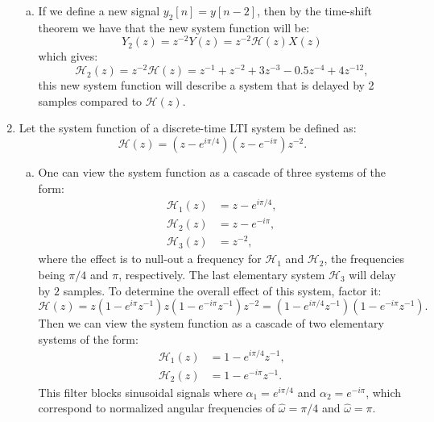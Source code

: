 \begin{enumerate}
\begin{enumerate}[a)]
              \item If we define a new signal $y_{2}[n]=y[n-2]$, then by the time-shift theorem we have that the new system function will be:
                    \[Y_{2}(z) = z^{-2}Y(z) = z^{-2}\mathcal{H}(z)X(z)\]
                    which gives:
                    \[\mathcal{H}_{2}(z) = z^{-2}\mathcal{H}(z) = z^{-1} + z^{-2} + 3z^{-3} - 0.5z^{-4} + 4z^{-12},\]
                    this new system function will describe a system that is delayed by 2 samples compared to $\mathcal{H}(z)$.
          \end{enumerate}

    \item Let the system function of a discrete-time LTI system be defined as:
          \[\mathcal{H}(z) = (z-e^{i\pi/4})(z-e^{-i\pi})z^{-2}.\]

          \begin{enumerate}[a)]
              \item One can view the system function as a cascade of three systems of the form:
                    \begin{align*}
                        \mathcal{H}_{1}(z) & = z - e^{i\pi/4}, \\
                        \mathcal{H}_{2}(z) & = z - e^{-i\pi},  \\
                        \mathcal{H}_{3}(z) & = z^{-2},
                    \end{align*}
                    where the effect is to null-out a frequency for $\mathcal{H}_1$ and $\mathcal{H}_2$, the frequencies being
                    $\pi/4$ and $\pi$, respectively. The last elementary system $\mathcal{H}_3$ will delay by $2$ samples.
                    To determine the overall effect of this system, factor it:
                    \[\mathcal{H}(z) = z(1-e^{i\pi}z^{-1})z(1-e^{-i\pi}z^{-1})z^{-2}=(1-e^{i\pi/4}z^{-1})(1-e^{-i\pi}z^{-1}).\]
                    Then we can view the system function as a cascade of two elementary systems of the form:
                    \begin{align*}
                        \mathcal{H}_{1}(z) & =1-e^{i\pi/4}z^{-1}, \\
                        \mathcal{H}_{2}(z) & =1-e^{-i\pi}z^{-1}.
                    \end{align*}
                    This filter blocks sinusoidal signals where $\alpha_{1}=e^{i\pi/4}$ and $\alpha_{2}=e^{-i\pi}$,
                    which correspond to normalized angular frequencies of $\hat{\omega}=\pi/4$ and $\hat{\omega}=\pi$.


\end{enumerate}
\end{enumerate}
